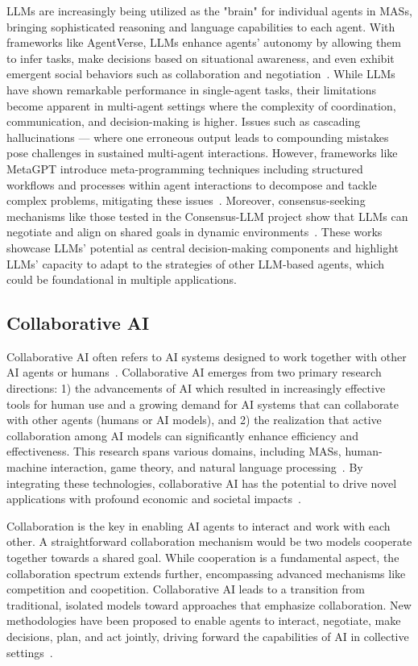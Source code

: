 \documentclass[acmsmall,nonacm]{acmart}
\begin{document}
        LLMs are increasingly being utilized as the "brain" for individual agents in MASs, bringing sophisticated reasoning and language capabilities to each agent. With frameworks like AgentVerse, LLMs enhance agents' autonomy by allowing them to infer tasks, make decisions based on situational awareness, and even exhibit emergent social behaviors such as collaboration and negotiation~\cite{chen2024agentverse}. While LLMs have shown remarkable performance in single-agent tasks, their limitations become apparent in multi-agent settings where the complexity of coordination, communication, and decision-making is higher. Issues such as cascading hallucinations — where one erroneous output leads to compounding mistakes pose challenges in sustained multi-agent interactions. However, frameworks like MetaGPT introduce meta-programming techniques including structured workflows and processes within agent interactions to decompose and tackle complex problems, mitigating these issues~\cite{hong2024metagpt}. Moreover, consensus-seeking mechanisms like those tested in the Consensus-LLM project show that LLMs can negotiate and align on shared goals in dynamic environments~\cite{Chen2023MultiAgent}. These works showcase LLMs' potential as central decision-making components and highlight LLMs' capacity to adapt to the strategies of other LLM-based agents, which could be foundational in multiple applications.

    \subsection{Collaborative AI}
        Collaborative AI often refers to AI systems designed to work together with other AI agents or humans~\cite{9918176}. Collaborative AI emerges from two primary research directions: 1) the advancements of AI which resulted in increasingly effective tools for human use and a growing demand for AI systems that can collaborate with other agents (humans or AI models), and 2) the realization that active collaboration among AI models can significantly enhance efficiency and effectiveness. This research spans various domains, including MASs, human-machine interaction, game theory, and natural language processing~\cite{abad2017autonomous,dafoe2020openproblemscooperativeai,Conitzer_Oesterheld_2024,braccini2024swarm}. By integrating these technologies, collaborative AI has the potential to drive novel applications with profound economic and societal impacts~\cite{MenaGuacas2023,OUYANG2024100616}.

        Collaboration is the key in enabling AI agents to interact and work with each other. A straightforward collaboration mechanism would be two models cooperate together towards a shared goal. While cooperation is a fundamental aspect, the collaboration spectrum extends further, encompassing advanced mechanisms like competition and coopetition.
        Collaborative AI leads to a transition from traditional, isolated models toward approaches that emphasize collaboration. New methodologies have been proposed to enable agents to interact, negotiate, make decisions, plan, and act jointly, driving forward the capabilities of AI in collective settings~\cite{Dafoe2021}.
\end{document}

